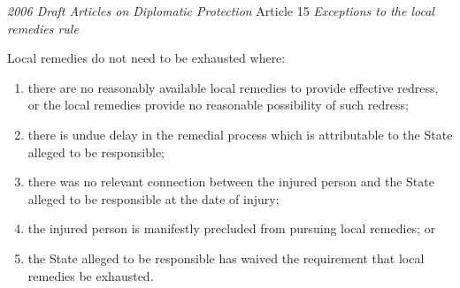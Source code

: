 \begin{conventiondetails}{\textit{2006 Draft Articles on Diplomatic Protection} Article 15}
    \flushleft
    \textit{Exceptions to the local remedies rule }

    \vspace{\baselineskip}

    Local remedies do not need to be exhausted where:
    \begin{enumerate}[label=(\alph*)]
        \item there are no reasonably available local remedies to provide effective redress, or the local remedies provide no reasonable possibility of such redress; 
        \item there is undue delay in the remedial process which is attributable to the State alleged to be responsible; 
        \item there was no relevant connection between the injured person and the State alleged to be responsible at the date of injury; 
        \item the injured person is manifestly precluded from pursuing local remedies; or 
        \item the State alleged to be responsible has waived the requirement that local remedies be exhausted.
    \end{enumerate}
\end{conventiondetails}

